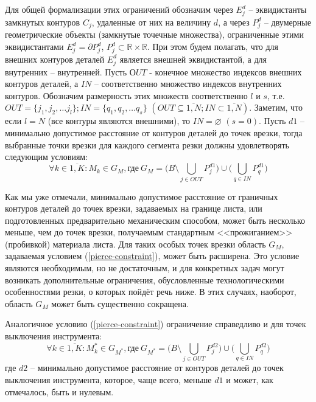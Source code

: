 \documentclass[11pt,twoside]{report}
\begin{document}
Для общей формализации этих ограничений обозначим через
$E_j^d$ – эквидистанты замкнутых контуров $C_j$,
удаленные от них на величину $d$,
а через
$P_j^d$ – двумерные геометрические объекты (замкнутые точечные множества),
ограниченные этими эквидистантами
$E_j^d = \partial P_j^d$,
$P_j^d \subset \mathbb R \times \mathbb R$.
При этом будем полагать,
что для внешних контуров деталей
$E_j^d$
является внешней эквидистантой,
а для внутренних – внутренней.
Пусть $ОUT$ - конечное множество индексов внешних контуров деталей,
а $IN$ – соответственно множество индексов внутренних контуров.
Обозначим  размерность этих множеств соответственно $l$ и $s$,
т.е.
$OUT = \{j_1, j_2, \dots j_l\};
IN = \{q_1, q_2, \dots q_s\}$
$(OUT  \subseteq \overline{1,N};
IN  \subset \overline{1,N})$.
Заметим, что если $l=N$
(все контуры являются внешними), то
$IN = \varnothing$
$(s = 0)$.
Пусть $d1$ – минимально допустимое расстояние от контуров деталей до точек врезки,
тогда выбранные точки врезки для каждого сегмента резки должны удовлетворять следующим условиям:
\begin{equation}
  \forall k \in \overline{1,K}:
  M_k \in G_M,
  \text{где}\:
  G_M = \big(B \setminus \bigcup_{j\in OUT} P_j^{d1} \big)
  \cup
  \big( \bigcup_{q\in IN}P_q^{d1} \big)
  \label{pierce-constraint}
\end{equation}

Как мы уже отмечали,
минимально допустимое расстояние от граничных контуров деталей
до точек врезки,
задаваемых на границе листа,
или подготовленных предварительно механическим способом,
может быть несколько меньше,
чем до точек врезки, получаемым стандартным <<прожиганием>> (пробивкой) материала листа.
Для таких особых точек врезки область $G_M$,
задаваемая условием (\ref{pierce-constraint}),
может быть расширена.
Это условие являются необходимым, но не достаточным,
и для конкретных задач могут возникать дополнительные ограничения,
обусловленные технологическими особенностями резки,
о которых пойдёт речь ниже.
В этих случаях, наоборот, область $G_M$
может быть существенно сокращена.

Аналогичное условию (\ref{pierce-constraint})
ограничение справедливо и для точек выключения инструмента:
\begin{equation}
  \forall k \in \overline{1,K}:
  M_k^* \in G_{M^*},
  \text{где}\:
  G_{M^*} = \big(B \setminus \bigcup_{j\in OUT} P_j^{d2} \big)
	\cup
  \big( \bigcup_{q\in IN}P_q^{d2} \big)
  \label{tool-off-constraint}
\end{equation}
где $d2$ – минимально допустимое расстояние
от контуров деталей до точек выключения инструмента,
которое, чаще всего, меньше $d1$
и может, как отмечалось, быть и нулевым.
\end{document}
